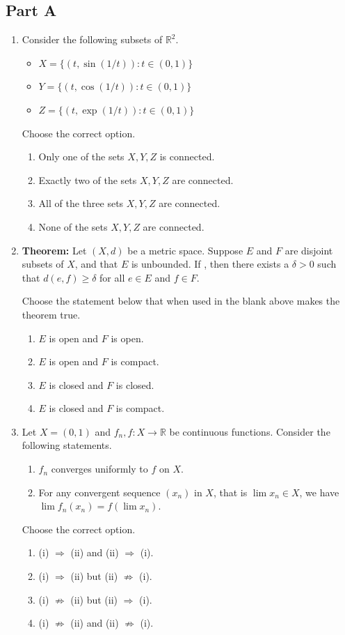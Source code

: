 \documentclass[11pt, a4paper]{article}
\begin{document}
\subsection*{Part A}
\begin{enumerate}
\item Consider the following subsets of $\mathbb{R}^2$.
\begin{itemize}
\item $X=\{(t,\sin(1/t)):t\in(0,1)\}$
\item $Y=\{(t,\cos(1/t)):t\in(0,1)\}$
\item $Z=\{(t,\exp(1/t)):t\in(0,1)\}$
\end{itemize}
Choose the correct option.
\begin{enumerate}[label=(\alph*)]
\item Only one of the sets $X,Y,Z$ is connected.
\item Exactly two of the sets $X,Y,Z$ are connected.
\item All of the three sets $X,Y,Z$ are connected.
\item None of the sets $X,Y,Z$ are connected.
\end{enumerate}

\item \textbf{Theorem:} Let $(X,d)$ be a metric space. Suppose $E$ and $F$ are disjoint subsets of $X$, and that $E$ is unbounded. If \underline{\hspace{3cm}}, then there exists a $\delta>0$ such that $d(e,f)\ge\delta$ for all $e\in E$ and $f\in F$.

Choose the statement below that when used in the blank above makes the theorem true.
\begin{enumerate}[label=(\alph*)]
\item $E$ is open and $F$ is open.
\item $E$ is open and $F$ is compact.
\item $E$ is closed and $F$ is closed.
\item $E$ is closed and $F$ is compact.
\end{enumerate}

\item Let $X=(0,1)$ and $f_n,f:X\to\mathbb{R}$ be continuous functions. Consider the following statements.
\begin{enumerate}[label=(\roman*)]
\item $f_n$ converges uniformly to $f$ on $X$.
\item For any convergent sequence $(x_n)$ in $X$, that is $\lim x_n\in X$, we have $\lim f_n(x_n)=f(\lim x_n)$.
\end{enumerate}
Choose the correct option.
\begin{enumerate}[label=(\alph*)]
\item (i) $\Rightarrow$ (ii) and (ii) $\Rightarrow$ (i).
\item (i) $\Rightarrow$ (ii) but (ii) $\not\Rightarrow$ (i).
\item (i) $\not\Rightarrow$ (ii) but (ii) $\Rightarrow$ (i).
\item (i) $\not\Rightarrow$ (ii) and (ii) $\not\Rightarrow$ (i).
\end{enumerate}


\end{enumerate}
\end{document}

